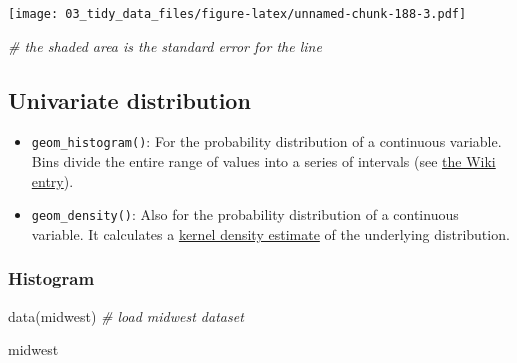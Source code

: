 \documentclass[
]{book}
\newenvironment{Shaded}{\begin{snugshade}}{\end{snugshade}}
\newcommand{\CommentTok}[1]{\textcolor[rgb]{0.56,0.35,0.01}{\textit{#1}}}
\newcommand{\FunctionTok}[1]{\textcolor[rgb]{0.00,0.00,0.00}{#1}}
\newcommand{\NormalTok}[1]{#1}
\providecommand{\tightlist}{%
  \setlength{\itemsep}{0pt}\setlength{\parskip}{0pt}}
\begin{document}
\texttt{[image: 03\_tidy\_data\_files/figure-latex/unnamed-chunk-188-3.pdf]}

\begin{Shaded}
\begin{Highlighting}[]
\CommentTok{\# the shaded area is the standard error for the line}
\end{Highlighting}
\end{Shaded}

\hypertarget{univariate-distribution}{%
\subsection{Univariate distribution}\label{univariate-distribution}}

\begin{itemize}
\tightlist
\item
  \texttt{geom\_histogram()}: For the probability distribution of a continuous variable. Bins divide the entire range of values into a series of intervals (see \href{https://en.wikipedia.org/wiki/Histogram}{the Wiki entry}).
\item
  \texttt{geom\_density()}: Also for the probability distribution of a continuous variable. It calculates a \href{https://en.wikipedia.org/wiki/Kernel_density_estimation}{kernel density estimate} of the underlying distribution.
\end{itemize}

\hypertarget{histogram}{%
\subsubsection{Histogram}\label{histogram}}

\begin{Shaded}
\begin{Highlighting}[]
\FunctionTok{data}\NormalTok{(midwest) }\CommentTok{\# load midwest dataset}

\NormalTok{midwest}
\end{Highlighting}
\end{Shaded}
\end{document}
